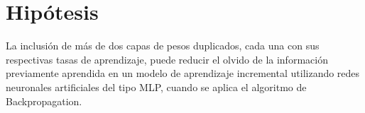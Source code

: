 \section{Hipótesis}
    
La inclusión de más de dos capas de pesos duplicados, cada una con sus respectivas tasas de aprendizaje, puede reducir el olvido de la información previamente aprendida en un modelo de aprendizaje incremental utilizando redes neuronales artificiales del tipo MLP, cuando se aplica el algoritmo de Backpropagation.

